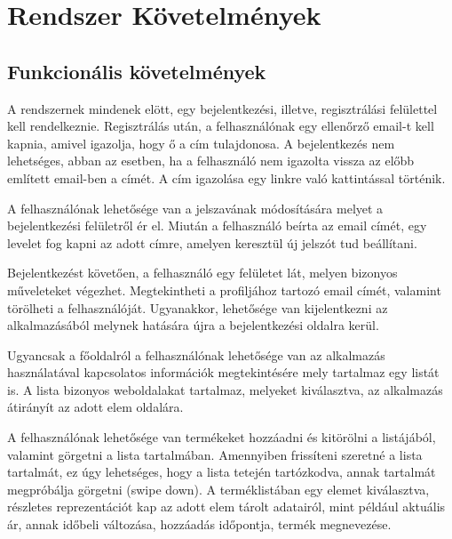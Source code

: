 
\section{Rendszer Követelmények}

\subsection{Funkcionális követelmények}

A rendszernek mindenek elött, egy bejelentkezési, illetve, regisztrálási felülettel kell rendelkeznie. Regisztrálás után, a felhasználónak egy ellenőrző email-t kell kapnia, amivel igazolja, hogy ő a cím tulajdonosa. A bejelentkezés nem lehetséges, abban az esetben, ha a felhasználó nem igazolta vissza az előbb említett email-ben a címét. A cím igazolása egy linkre való kattintással történik.

A felhasználónak lehetősége van a jelszavának módosítására melyet a bejelentkezési felületről ér el. Miután a felhasználó beírta az email címét, egy levelet fog kapni az adott címre, amelyen keresztül új jelszót tud beállítani.

Bejelentkezést követően, a felhasználó egy felületet lát, melyen bizonyos műveleteket végezhet. Megtekintheti a profiljához tartozó email címét, valamint törölheti a felhasználóját. Ugyanakkor, lehetősége van kijelentkezni az alkalmazásából melynek hatására újra a bejelentkezési oldalra kerül.

Ugyancsak a főoldalról a felhasználónak lehetősége van az alkalmazás használatával kapcsolatos információk megtekintésére mely tartalmaz egy listát is. A lista bizonyos weboldalakat tartalmaz, melyeket kiválasztva, az alkalmazás átirányít az adott elem oldalára.

A felhasználónak lehetősége van termékeket hozzáadni és kitörölni a listájából, valamint görgetni a lista tartalmában. Amennyiben frissíteni szeretné a lista tartalmát, ez úgy lehetséges, hogy a lista tetején tartózkodva, annak tartalmát megpróbálja görgetni (swipe down). A terméklistában egy elemet kiválasztva, részletes reprezentációt kap az adott elem tárolt adatairól, mint például aktuális ár, annak időbeli változása, hozzáadás időpontja, termék megnevezése.

